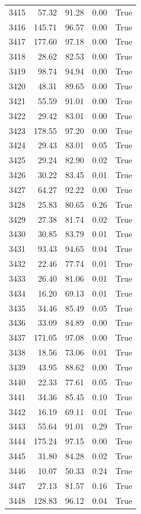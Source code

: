 \begin{longtable}{rrrrr}
3415 & 57.32 & 91.28 & 0.00 & True \\
3416 & 145.71 & 96.57 & 0.00 & True \\
3417 & 177.60 & 97.18 & 0.00 & True \\
3418 & 28.62 & 82.53 & 0.00 & True \\
3419 & 98.74 & 94.94 & 0.00 & True \\
3420 & 48.31 & 89.65 & 0.00 & True \\
3421 & 55.59 & 91.01 & 0.00 & True \\
3422 & 29.42 & 83.01 & 0.00 & True \\
3423 & 178.55 & 97.20 & 0.00 & True \\
3424 & 29.43 & 83.01 & 0.05 & True \\
3425 & 29.24 & 82.90 & 0.02 & True \\
3426 & 30.22 & 83.45 & 0.01 & True \\
3427 & 64.27 & 92.22 & 0.00 & True \\
3428 & 25.83 & 80.65 & 0.26 & True \\
3429 & 27.38 & 81.74 & 0.02 & True \\
3430 & 30.85 & 83.79 & 0.01 & True \\
3431 & 93.43 & 94.65 & 0.04 & True \\
3432 & 22.46 & 77.74 & 0.01 & True \\
3433 & 26.40 & 81.06 & 0.01 & True \\
3434 & 16.20 & 69.13 & 0.01 & True \\
3435 & 34.46 & 85.49 & 0.05 & True \\
3436 & 33.09 & 84.89 & 0.00 & True \\
3437 & 171.05 & 97.08 & 0.00 & True \\
3438 & 18.56 & 73.06 & 0.01 & True \\
3439 & 43.95 & 88.62 & 0.00 & True \\
3440 & 22.33 & 77.61 & 0.05 & True \\
3441 & 34.36 & 85.45 & 0.10 & True \\
3442 & 16.19 & 69.11 & 0.01 & True \\
3443 & 55.64 & 91.01 & 0.29 & True \\
3444 & 175.24 & 97.15 & 0.00 & True \\
3445 & 31.80 & 84.28 & 0.02 & True \\
3446 & 10.07 & 50.33 & 0.24 & True \\
3447 & 27.13 & 81.57 & 0.16 & True \\
3448 & 128.83 & 96.12 & 0.04 & True \\

\end{longtable}
